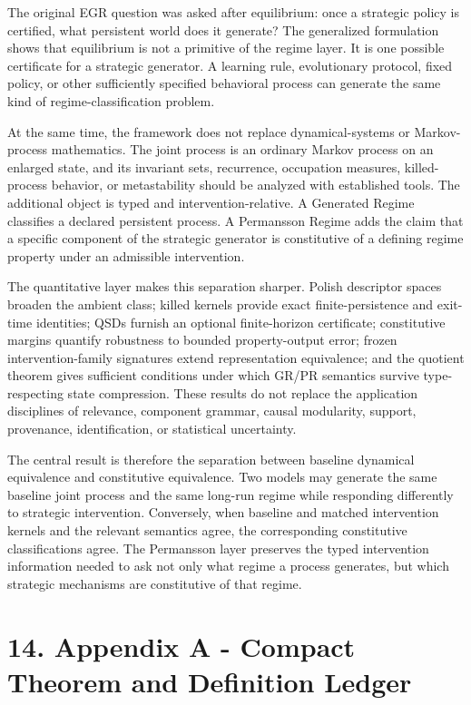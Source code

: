 \documentclass[10pt]{article}
\begin{document}
The original EGR question was asked after equilibrium: once a strategic
policy is certified, what persistent world does it generate? The
generalized formulation shows that equilibrium is not a primitive of the
regime layer. It is one possible certificate for a strategic generator.
A learning rule, evolutionary protocol, fixed policy, or other
sufficiently specified behavioral process can generate the same kind of
regime-classification problem.

At the same time, the framework does not replace dynamical-systems or Markov-process mathematics. The joint process is an ordinary Markov process on an enlarged state, and its invariant sets, recurrence, occupation measures, killed-process behavior, or metastability should be analyzed with established tools. The additional object is typed and intervention-relative. A Generated Regime classifies a declared persistent process. A Permansson Regime adds the claim that a specific component of the strategic generator is constitutive of a defining regime property under an admissible intervention.

The quantitative layer makes this separation sharper. Polish descriptor spaces broaden the ambient class; killed kernels provide exact finite-persistence and exit-time identities; QSDs furnish an optional finite-horizon certificate; constitutive margins quantify robustness to bounded property-output error; frozen intervention-family signatures extend representation equivalence; and the quotient theorem gives sufficient conditions under which GR/PR semantics survive type-respecting state compression. These results do not replace the application disciplines of relevance, component grammar, causal modularity, support, provenance, identification, or statistical uncertainty.

The central result is therefore the separation between baseline dynamical equivalence and constitutive equivalence. Two models may generate the same baseline joint process and the same long-run regime while responding differently to strategic intervention. Conversely, when baseline and matched intervention kernels and the relevant semantics agree, the corresponding constitutive classifications agree. The Permansson layer preserves the typed intervention information needed to ask not only what regime a process generates, but which strategic mechanisms are constitutive of that regime.

\section{14. Appendix A - Compact Theorem and Definition Ledger}\label{appendix-a---compact-theorem-and-definition-ledger}
\end{document}
